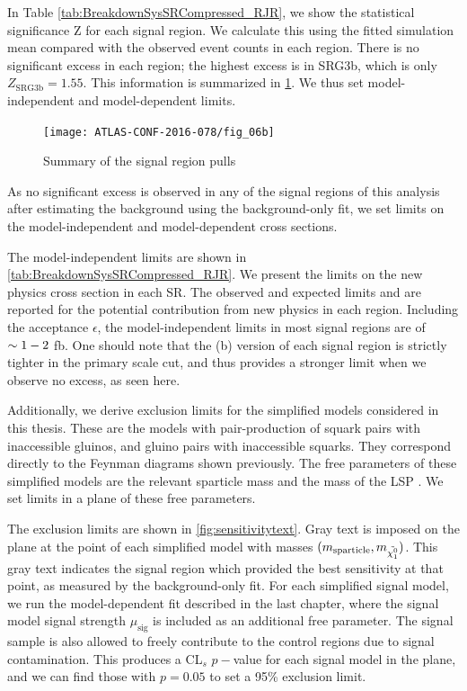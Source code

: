 In Table \ref{tab:BreakdownSysSRCompressed_RJR}, we show the statistical significance Z for each signal region.
We calculate this using the fitted simulation mean compared with the observed event counts in each region.
There is no significant excess in each region; the highest excess is in SRG3b, which is only $Z_{\text{SRG3b}} = 1.55$.
This information is summarized in \ref{fig:sr_summary}.
We thus set model-independent and model-dependent limits.

\begin{figure}[tbph]
\centering
\caption{Summary of the signal region pulls} \label{fig:sr_summary}
\texttt{[image: ATLAS-CONF-2016-078/fig\_06b]}
\end{figure}


As no significant excess is observed in any of the signal regions of this analysis after estimating the background using the background-only fit, we set limits on the model-independent and model-dependent cross sections.

The model-independent limits are shown in \ref{tab:BreakdownSysSRCompressed_RJR}.
We present the limits on the new physics cross section in each SR.
The observed and expected limits \sobs and \sexp are reported for the potential contribution from new physics in each region.
Including the acceptance $\epsilon$, the model-independent limits in most signal regions are of $\sim 1-2$ fb.
One should note that the (b) version of each signal region is strictly tighter in the primary scale cut, and thus provides a stronger limit when we observe no excess, as seen here.

Additionally, we derive exclusion limits for the simplified models considered in this thesis.
These are the models with pair-production of squark pairs with inaccessible gluinos, and gluino pairs with inaccessible squarks.
They correspond directly to the Feynman diagrams shown previously.
The free parameters of these simplified models are the relevant sparticle mass and the mass of the LSP \lsp.
We set limits in a plane of these free parameters.

The exclusion limits are shown in \ref{fig:sensitivitytext}.
Gray text is imposed on the plane at the point of each simplified model with masses $(m_{\mathrm{sparticle}}, m_{\tilde{\chi^0_1}})$.
This gray text indicates the signal region which provided the best sensitivity at that point, as measured by the background-only fit.
For each simplified signal model, we run the model-dependent fit described in the last chapter, where the signal model signal strength $\mu_{\mathrm{sig}}$ is included as an additional free parameter.
The signal sample is also allowed to freely contribute to the control regions due to signal contamination.
This produces a CL$_s$ $p-$value for each signal model in the plane, and we can find those with $p = 0.05$ to set a 95\% exclusion limit.

